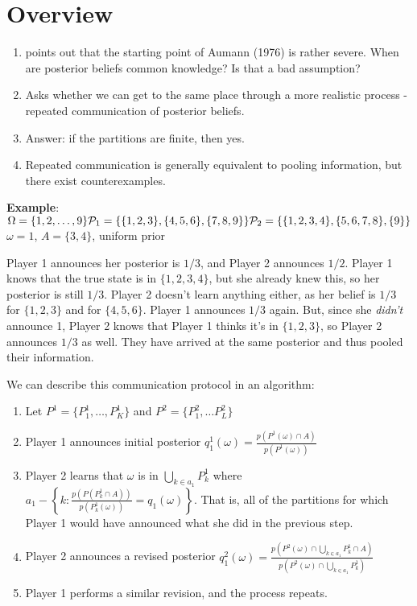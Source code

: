 
 {}

\section*{Overview}
\begin{enumerate}
	\item points out that the starting point of Aumann (1976) is rather severe.  When are posterior beliefs common knowledge? Is that a bad assumption?
	\item Asks whether we can get to the same place through a more realistic process - repeated communication of posterior beliefs.
	\item Answer: if the partitions are finite, then yes.
	\item Repeated communication is generally equivalent to pooling information, but there exist counterexamples.
\end{enumerate}

\textbf{Example}:\\
$\Omega = \{1,2,\dots,9\}\\\mathcal{P}_1=\{\{1,2,3\},\{4,5,6\},\{7,8,9\}\}\\\mathcal{P}_2=\{\{1,2,3,4\},\{5,6,7,8\},\{9\}\}$\\$\omega=1$, $A=\{3,4\}$, uniform prior

Player 1 announces her posterior is $1/3$, and Player 2 announces $1/2$.  Player 1 knows that the true state is in $\{1,2,3,4\}$, but she already knew this, so her posterior is still $1/3$.  Player 2 doesn't learn anything either, as her belief is $1/3$ for $\{1,2,3\}$ and for $\{4,5,6\}$.  Player 1 announces $1/3$ again.  But, since she \textit{didn't} announce 1, Player 2 knows that Player 1 thinks it's in $\{1,2,3\}$, so Player 2 announces $1/3$ as well.  They have arrived at the same posterior and thus pooled their information.

We can describe this communication protocol in an algorithm:

\begin{enumerate}
	
		
		\item Let $P^1=\{P_1^1,\dots,P_K^1\}$ and $P^2=\{P_1^2,\dots P_L^2\}$
		\item Player 1 announces initial posterior $q_1^1(\omega) = \frac{p(P^1(\omega)\cap A)}{p(P^1(\omega))}$
		\item Player 2 learns that $\omega$ is in $\bigcup\limits_{k\in a_1}P_k^1$ where $a_1-\left\{ k:\frac{p(P(P_k^1\cap A))}{p(P^1_k(\omega))} = q_1(\omega)   \right\}$.  That is, all of the partitions for which Player 1 would have announced what she did in the previous step.
		\item Player 2 announces a revised posterior $q^2_1(\omega) = \frac{p(P^2(\omega)\cap\bigcup\limits_{k\in a_1}P^1_k \cap A)}{p(P^2(\omega)  \cap \bigcup\limits_{k\in a_1}P^1_k  )}$
		\item Player 1 performs a similar revision, and the process repeats.
		

\end{enumerate}
